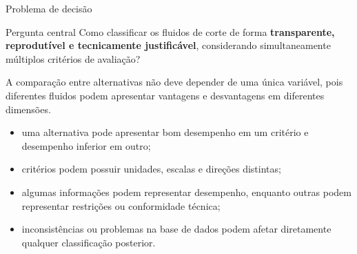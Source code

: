 %
%
%
%



\begin{frame}{Problema de decisão}

    \begin{block}{Pergunta central}
        Como classificar os fluidos de corte de forma
        \textbf{transparente, reprodutível e tecnicamente justificável},
        considerando simultaneamente múltiplos critérios de avaliação?
    \end{block}

    \vspace{0.3cm}

    A comparação entre alternativas não deve depender de uma única
    variável, pois diferentes fluidos podem apresentar vantagens e
    desvantagens em diferentes dimensões.

    \vspace{0.3cm}

    \begin{itemize}
        \item uma alternativa pode apresentar bom desempenho em um critério
              e desempenho inferior em outro;

        \item critérios podem possuir unidades, escalas e direções distintas;

        \item algumas informações podem representar desempenho, enquanto
              outras podem representar restrições ou conformidade técnica;

        \item inconsistências ou problemas na base de dados podem afetar
              diretamente qualquer classificação posterior.
    \end{itemize}

\end{frame}



